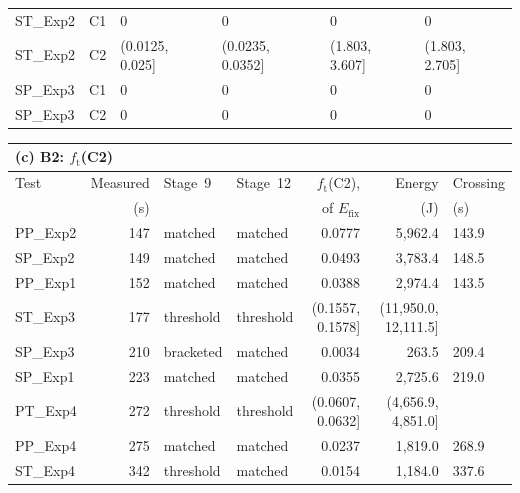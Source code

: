 \begin{table}[p]
\begin{tabular}{llllll}
ST\_Exp2 & C1 & 0 & 0 & 0 & 0 \\
ST\_Exp2 & C2 & (0.0125, 0.025] & (0.0235, 0.0352] & (1.803, 3.607] & (1.803, 2.705] \\
SP\_Exp3 & C1 & 0 & 0 & 0 & 0 \\
SP\_Exp3 & C2 & 0 & 0 & 0 & 0 \\
\bottomrule
\end{tabular}
\par\bigskip
\begin{tabular}{lrllrrl}
\multicolumn{7}{l}{(c) B2: $f_\mathrm{t}$(C2)} \\
\toprule
Test & Measured & Stage~9 & Stage~12 & $f_\mathrm{t}$(C2), & Energy & Crossing \\
 & (s) & & & of $E_\mathrm{fix}$ & (J) & (s) \\
\midrule
PP\_Exp2 & 147 & matched & matched & 0.0777 & 5{,}962.4 & 143.9 \\
SP\_Exp2 & 149 & matched & matched & 0.0493 & 3{,}783.4 & 148.5 \\
PP\_Exp1 & 152 & matched & matched & 0.0388 & 2{,}974.4 & 143.5 \\
ST\_Exp3 & 177 & threshold & threshold & (0.1557, 0.1578] & (11{,}950.0, 12{,}111.5] &  \\
SP\_Exp3 & 210 & bracketed & matched & 0.0034 & 263.5 & 209.4 \\
SP\_Exp1 & 223 & matched & matched & 0.0355 & 2{,}725.6 & 219.0 \\
PT\_Exp4 & 272 & threshold & threshold & (0.0607, 0.0632] & (4{,}656.9, 4{,}851.0] &  \\
PP\_Exp4 & 275 & matched & matched & 0.0237 & 1{,}819.0 & 268.9 \\
ST\_Exp4 & 342 & threshold & matched & 0.0154 & 1{,}184.0 & 337.6 \\
\bottomrule
\end{tabular}
\end{table}
